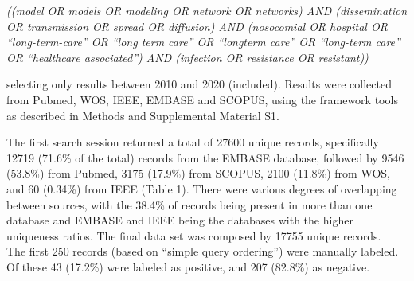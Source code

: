 \documentclass{article}
\begin{document}
\emph{((model OR models OR modeling OR network OR networks) AND
(dissemination OR transmission OR spread OR diffusion) AND (nosocomial
OR hospital OR ``long-term-care'' OR ``long term care'' OR ``longterm
care'' OR ``long-term care'' OR ``healthcare associated'') AND
(infection OR resistance OR resistant))}

selecting only results between 2010 and 2020 (included). Results were
collected from Pubmed, WOS, IEEE, EMBASE and SCOPUS, using the framework
tools as described in Methods and Supplemental Material S1.

The first search session returned a total of 27600 unique records,
specifically 12719 (71.6\% of the total) records from the EMBASE
database, followed by 9546 (53.8\%) from Pubmed, 3175 (17.9\%) from
SCOPUS, 2100 (11.8\%) from WOS, and 60 (0.34\%) from IEEE (Table 1).
There were various degrees of overlapping between sources, with the
38.4\% of records being present in more than one database and EMBASE and
IEEE being the databases with the higher uniqueness ratios. The final
data set was composed by 17755 unique records.\\
The first 250 records (based on ``simple query ordering'') were manually
labeled. Of these 43 (17.2\%) were labeled as positive, and 207 (82.8\%)
as negative.
\end{document}

